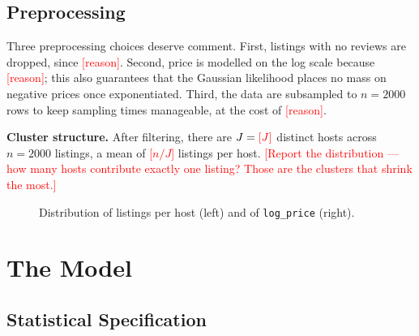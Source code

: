 \documentclass[11pt,a4paper]{article}
\begin{document}
\subsection{Preprocessing}

Three preprocessing choices deserve comment. First, listings with no reviews are
dropped, since \textcolor{red}{[reason]}. Second, price is modelled on the log
scale because \textcolor{red}{[reason]}; this also guarantees that the Gaussian
likelihood places no mass on negative prices once exponentiated. Third, the data
are subsampled to $n = 2000$ rows to keep sampling times manageable, at the cost
of \textcolor{red}{[reason]}.

\textbf{Cluster structure.} After filtering, there are $J = \textcolor{red}{[J]}$
distinct hosts across $n = 2000$ listings, a mean of
\textcolor{red}{[$n/J$]} listings per host. \textcolor{red}{[Report the
distribution --- how many hosts contribute exactly one listing? Those are the
clusters that shrink the most.]}

\begin{figure}[htbp]
\centering
\caption{Distribution of listings per host (left) and of \texttt{log\_price} (right).}
\label{fig:eda}
\end{figure}

\section{The Model}\label{sec:model}

\subsection{Statistical Specification}
\end{document}
